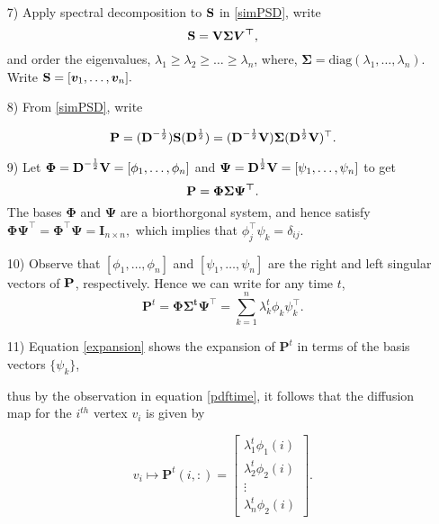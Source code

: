 \begin{itemize}
\item[7)] Apply spectral decomposition to $\textbf{S}$ in \eqref{simPSD}, write
\begin{equation}
\textbf{S} = \textbf{V}\bm{\Sigma}\bm{V^{\top}},
\end{equation}
and order the eigenvalues, $\lambda_{1}\geq \lambda_{2} \geq \ldots \geq \lambda_{n}$, where,  
$\bm{\Sigma} = \text{diag}(\lambda_{1}, \ldots, \lambda_{n})$. Write 
$\textbf{S} = [\boldsymbol{v}_{1}, \ldots, \boldsymbol{v}_{n}].$

\item[8)] From \eqref{simPSD}, write 

\[\textbf{P} = (\textbf{D}^{-\frac{1}{2}}) \textbf{S} (\textbf{D}^{\frac{1}{2}} ) = 
 (\textbf{D}^{-\frac{1}{2}} \textbf{V}) \bm{\Sigma} (\textbf{D}^{\frac{1}{2}} \textbf{V} )^{\top}.
\] 
\item[9)] Let $\bm{\Phi} = \textbf{D}^{-\frac{1}{2}} \textbf{V}  = [\phi_{1}, \ldots, \phi_{n}]$ and 
$\bm{\Psi} = \textbf{D}^{\frac{1}{2}} \textbf{V} = [\psi_{1}, \ldots, \psi_{n}] $
to get  
\[\textbf{P} = \bm{\Phi \Sigma \Psi^{\top}}.
\]
The bases $\bm{\Phi}$ and $\bm{\Psi}$ are a biorthorgonal system, and hence satisfy
$ \bm{\Phi}\bm{\Psi}^{\top} =  \bm{\Phi}^{\top}\bm{\Psi}  = \bm{I}_{n \times n},$
which implies that $\phi_{j}^{\top}\psi_{k} = \delta_{ij}$.
\item[10)] Observe that  $[\phi_{1}, \ldots, \phi_{n}]$ and $[\psi_{1}, \ldots, \psi_{n}]$ are the right and left singular vectors of $\textbf{P}$, respectively.
Hence we can write for any time $t$,
\begin{equation}\label{expansion}
 \bm{P}^{t} = \bm{\Phi \Sigma^{t} \Psi^{\top}} = \displaystyle \sum_{k=1}^{n} \lambda_{k}^{t} \phi_{k} \psi_{k}^{\top}.
\end{equation} 

\item[11)] Equation \eqref{expansion} shows the expansion of $\bm{P}^{t}$ 
in terms of  the basis vectors $\{\psi_{k}\}$, 

thus by the observation in equation \eqref{pdftime}, it follows that the diffusion map for the $i^{th}$ vertex $v_{i}$ is given by

$$ v_{i} \mapsto \bm{P}^{t}(i,:) = \begin{bmatrix}
         \lambda_{1}^{t}\phi_{1}(i)\\
         \lambda_{2}^{t}\phi_{2}(i)\\
         \vdots\\
         \lambda_{n}^{t}\phi_{2}(i)
        \end{bmatrix} .$$
        

\end{itemize}
